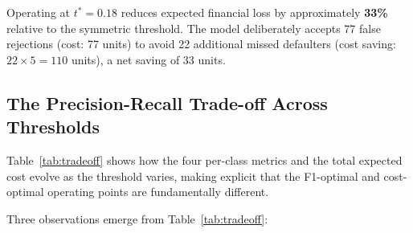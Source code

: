 \documentclass[12pt,a4paper]{article}
\begin{document}
Operating at $t^* = 0.18$ reduces expected financial loss by approximately
\textbf{33\%} relative to the symmetric threshold. The model deliberately
accepts 77 false rejections (cost: 77 units) to avoid 22 additional missed
defaulters (cost saving: $22 \times 5 = 110$ units), a net saving of 33
units.

\subsection{The Precision-Recall Trade-off Across Thresholds}

Table~\ref{tab:tradeoff} shows how the four per-class metrics and the total
expected cost evolve as the threshold varies, making explicit that the F1-optimal
and cost-optimal operating points are fundamentally different.

\begin{table}[H]
\centering
\caption{Per-Class Metric Trade-off at Different Thresholds (ACO Ensemble)}
\label{tab:tradeoff}

\end{table}

Three observations emerge from Table~\ref{tab:tradeoff}:
\end{document}
